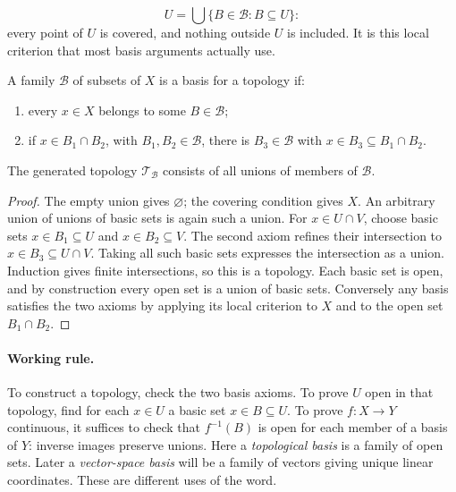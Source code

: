 \[
U=\bigcup\{B\in\mathcal B:B\subseteq U\}:
\]
 every point of $U$ is
covered, and nothing outside $U$ is included. It is this local criterion
that most basis arguments actually use.

\begin{proposition}\label{prop:basis-criterion}
A family $\mathcal B$ of subsets of $X$ is a basis for a topology if:
\begin{enumerate}
\item every $x\in X$ belongs to some $B\in\mathcal B$;
\item if $x\in B_1\cap B_2$, with $B_1,B_2\in\mathcal B$, there is
$B_3\in\mathcal B$ with $x\in B_3\subseteq B_1\cap B_2$.
\end{enumerate}
The generated topology $\mathcal T_{\mathcal B}$ consists of all unions
of members of $\mathcal B$.
\end{proposition}
\begin{proof}
The empty union gives $\varnothing$; the covering condition gives $X$.
An arbitrary union of unions of basic sets is again such a union.
For $x\in U\cap V$, choose basic sets $x\in B_1\subseteq U$ and
$x\in B_2\subseteq V$. The second axiom refines their intersection to
$x\in B_3\subseteq U\cap V$. Taking all such basic sets expresses the
intersection as a union. Induction gives finite intersections, so this is
a topology. Each basic set is open, and by construction every open set is
a union of basic sets. Conversely any basis satisfies the two axioms by
applying its local criterion to $X$ and to the open set $B_1\cap B_2$.
\end{proof}
\paragraph{Working rule.}
To construct a topology, check the two basis axioms. To prove $U$ open in
that topology, find for each $x\in U$ a basic set $x\in B\subseteq U$.
To prove $f:X\to Y$ continuous, it suffices to check that $f^{-1}(B)$ is
open for each member of a basis of $Y$: inverse images preserve unions.
Here a \emph{topological basis} is a family of open sets. Later a
\emph{vector-space basis} will be a family of vectors giving unique linear
coordinates. These are different uses of the word.

